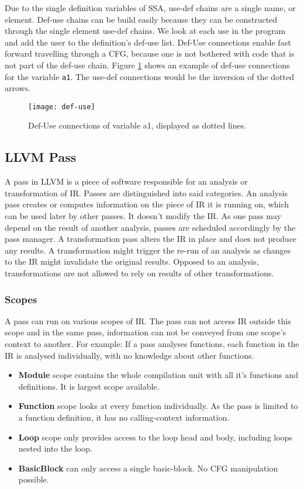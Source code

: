 Due to the single definition variables of SSA, use-def chains are a single name, or element. Def-use chains can be build easily because they can be constructed through the single element use-def chains. We look at each use in the program and add the user to the definition's def-use list. Def-Use connections enable fast forward travelling through a CFG, because one is not bothered with code that is not part of the def-use chain. Figure \ref{def-use} shows an example of def-use connections for the variable \verb|a1|. The use-def connections would be the inversion of the dotted arrows. \cite{Rastello:2016:SCD:3002539}
\begin{figure}[t]
	\centering
	\texttt{[image: def-use]}
	\caption{Def-Use connections of variable a1, displayed as dotted lines.}
	\label{def-use}
\end{figure}

\subsection{LLVM Pass}\label{llvmpass}
A pass in LLVM is a piece of software responsible for an analysis or transformation of IR. Passes are distinguished into said categories. An analysis pass creates or computes information on the piece of IR it is running on, which can be used later by other passes. It doesn't modify the IR. As one pass may depend on the result of another analysis, passes are scheduled accordingly by the pass manager. A transformation pass alters the IR in place and does not produce any results. A transformation might trigger the re-run of an analysis as changes to the IR might invalidate the original results. Opposed to an analysis, transformations are not allowed to rely on results of other transformations. \cite{llvm-passes}

\subsubsection{Scopes}
A pass can run on various scopes of IR. The pass can not access IR outside this scope and in the same pass, information can not be conveyed from one scope's context to another. For example: If a pass analyses functions, each function in the IR is analysed individually, with no knowledge about other functions. \cite{llvm-scopes}
\begin{itemize}
	\item \textbf{Module} scope contains the whole compilation unit with all it's functions and definitions. It is largest scope available.
	\item \textbf{Function} scope looks at every function individually. As the pass is limited to a function definition, it has no calling-context information. 
	\item \textbf{Loop} scope only provides access to the loop head and body, including loops nested into the loop.
	\item \textbf{BasicBlock} can only access a single basic-block. No CFG manipulation possible.
\end{itemize}

